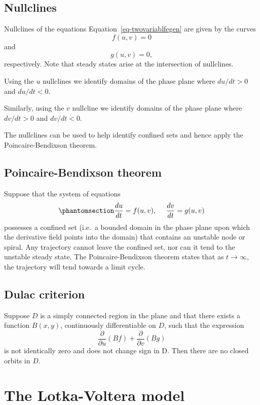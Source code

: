 \documentclass[
  letterpaper,
  DIV=11,
  numbers=noendperiod]{scrreprt}
\begin{document}
\subsection{Nullclines}\label{nullclines}

Nullclines of the equations Equation~\ref{eq-twovariablfegen} are given
by the curves \[
f(u,v)=0
\] and \[
 g(u,v)=0,
\] respectively. Note that steady states arise at the intersection of
nullclines.

Using the \(u\) nullclines we identify domains of the phase plane where
\(du/dt >0\) and \(du/dt <0\).

Similarly, using the \(v\) nullcline we identify domains of the phase
plane where \(dv/dt >0\) and \(dv/dt <0\).

The nullclines can be used to help identify confined sets and hence
apply the Poincaire-Bendixson theorem.

\subsection{Poincaire-Bendixson
theorem}\label{poincaire-bendixson-theorem}

Suppose that the system of equations
\begin{equation}\protect\phantomsection\label{eq-xygenphaseplane}{
\frac{du}{dt}=f(u,v), \ \ \ \ \frac{dv}{dt}=g(u,v)
}\end{equation} possesses a confined set (i.e.~a bounded domain in the
phase plane upon which the derivative field points into the domain) that
contains an unstable node or spiral. Any trajectory cannot leave the
confined set, nor can it tend to the unstable steady state. The
Poincaire-Bendixson theorem states that as \(t\rightarrow \infty\), the
trajectory will tend towards a limit cycle.

\subsection{Dulac criterion}\label{dulac-criterion}

Suppose \(D\) is a simply connected region in the plane and that there
exists a function \(B(x,y)\), continuously differentiable on \(D\), such
that the expression \[
\frac{\partial }{\partial u} (Bf) + \frac{\partial }{\partial v} (Bg)
\] is not identically zero and does not change sign in D. Then there are
no closed orbits in \(D\).

\section{The Lotka-Voltera model}\label{the-lotka-voltera-model}
\end{document}
